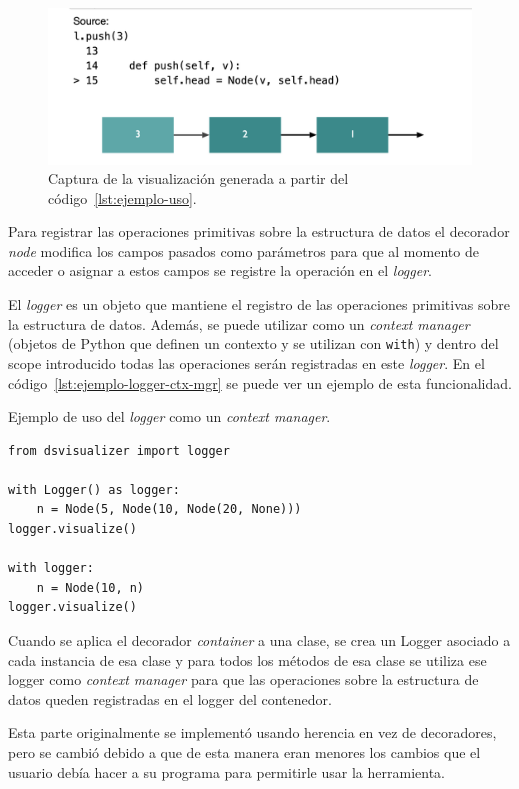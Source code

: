 \begin{figure}[htb]
    \centering
    \includegraphics[width=\linewidth]{imagenes/ejemplos/ejemplo}
    \caption{Captura de la visualización generada a partir del código~\ref{lst:ejemplo-uso}.}
    \label{fig:visualizacion_ej}
    \centering
\end{figure}

Para registrar las operaciones primitivas sobre la estructura de datos el decorador \textit{node} modifica los campos pasados como parámetros para que al momento de acceder o asignar a estos campos se registre la operación en el \textit{logger}.

El \textit{logger} es un objeto que mantiene el registro de las operaciones primitivas sobre la estructura de datos. Además, se puede utilizar como un \textit{context manager} (objetos de Python que definen un contexto y se utilizan con \texttt{with}) y dentro del scope introducido todas las operaciones serán registradas en este \textit{logger}. En el código~\ref{lst:ejemplo-logger-ctx-mgr} se puede ver un ejemplo de esta funcionalidad.

\begin{listing}[htb]
\caption{Ejemplo de uso del \textit{logger} como un \textit{context manager}.}
\label{lst:ejemplo-logger-ctx-mgr}
\begin{verbatim}
from dsvisualizer import logger

with Logger() as logger:
    n = Node(5, Node(10, Node(20, None)))
logger.visualize()

with logger:
    n = Node(10, n)
logger.visualize()
\end{verbatim}
\end{listing}

Cuando se aplica el decorador \textit{container} a una clase, se crea un Logger asociado a cada instancia de esa clase y para todos los métodos de esa clase se utiliza ese logger como \textit{context manager} para que las operaciones sobre la estructura de datos queden registradas en el logger del contenedor.

Esta parte originalmente se implementó usando herencia en vez de decoradores, pero se cambió debido a que de esta manera eran menores los cambios que el usuario debía hacer a su programa para permitirle usar la herramienta.
